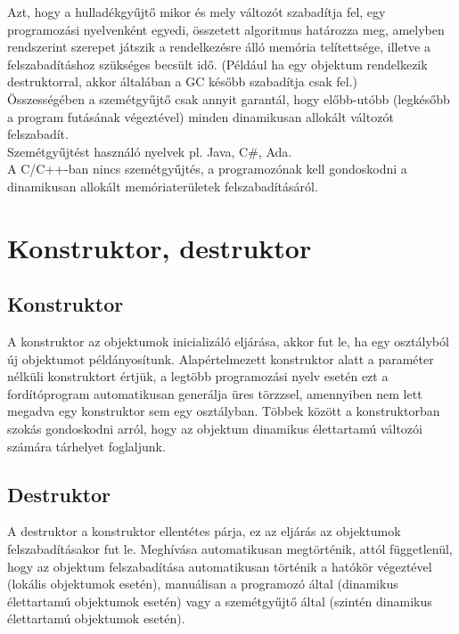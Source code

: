 \documentclass[12pt,margin=0px]{article}
\begin{document}
    \noindent Azt, hogy a hulladékgyűjtő mikor és mely változót szabadítja fel, egy programozási nyelvenként egyedi, összetett algoritmus határozza meg, amelyben rendszerint szerepet játszik a rendelkezésre álló memória telítettsége, illetve a felszabadításhoz szükséges becsült idő. (Például ha egy objektum rendelkezik destruktorral, akkor általában a GC később szabadítja csak fel.)\\
	
    \noindent Összességében a szemétgyűjtő csak annyit garantál, hogy előbb-utóbb (legkésőbb a program futásának végeztével) minden dinamikusan allokált változót felszabadít.\\
	
    \noindent Szemétgyűjtést használó nyelvek pl. Java, C\#, Ada.\\
    A C/C++-ban nincs szemétgyűjtés, a programozónak kell gondoskodni a dinamikusan allokált memóriaterületek felszabadításáról.

	\section{Konstruktor, destruktor}

	\subsection{Konstruktor}
	
    A konstruktor az objektumok inicializáló eljárása, akkor fut le, ha egy osztályból új objektumot példányosítunk. Alapértelmezett konstruktor alatt a paraméter nélküli konstruktort értjük, a legtöbb programozási nyelv esetén ezt a fordítóprogram automatikusan generálja üres törzzsel, amennyiben nem lett megadva egy konstruktor sem egy osztályban.
	Többek között a konstruktorban szokás gondoskodni arról, hogy az objektum dinamikus élettartamú változói számára tárhelyet foglaljunk.
	
	\subsection{Destruktor}
	
    A destruktor a konstruktor ellentétes párja, ez az eljárás az objektumok felszabadításakor fut le. Meghívása automatikusan megtörténik, attól függetlenül, hogy az objektum felszabadítása automatikusan történik a hatókör végeztével (lokális objektumok esetén), manuálisan a programozó	által (dinamikus élettartamú objektumok esetén) vagy a szemétgyűjtő által (szintén dinamikus élettartamú objektumok esetén).\\
	
\end{document}
